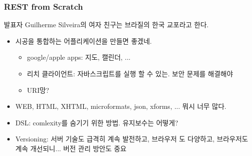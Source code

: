 \begin{frame}
\frametitle{REST from Scratch}
발표자 Guilherme Silveira의 여자 친구는 브라질의 한국 교포라고 한다.
 
\begin{itemize}
\item 시공을 통합하는 어플리케이션을 만들면 좋겠네.
  \begin{itemize}
  \item google/apple apps: 지도, 캘린더, ...
  \item 리치 클라이언트: 자바스크립트를 실행 할 수 있는. 보안 문제를
    해결해야
  \item URI망?
  \end{itemize}
\item  WEB, HTML, XHTML, microformats, json, xforms, ... 뭐시 너무 많다.
\item DSL: comlexity를 숨기기 위한 방법. 유지보수는 어떻게?
\item Versioning: 서버 기술도 급격히 계속 발전하고, 브라우저 도
  다양하고, 브라우저도 계속 개선되니... 버전 관리 방안도 중요
\end{itemize}

\end{frame}
